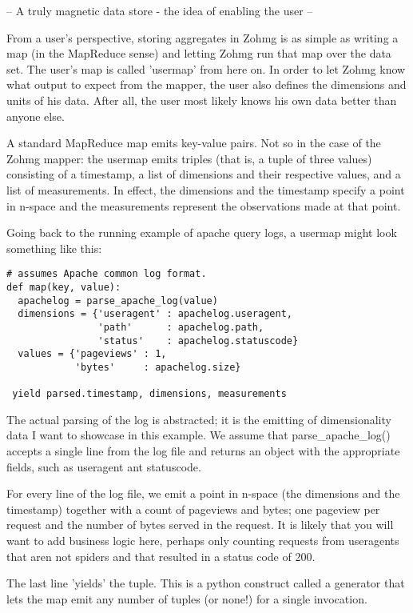 \documentclass[a4paper,10pt]{book}
\begin{document}

-- A truly magnetic data store - the idea of enabling the user --

From a user's perspective, storing aggregates in Zohmg is as simple as writing
a map (in the MapReduce sense) and letting Zohmg run that map over the data
set. The user's map is called 'usermap' from here on. In order to let Zohmg
know what output to expect from the mapper, the user also defines the
dimensions and units of his data. After all, the user most likely knows his
own data better than anyone else.

A standard MapReduce map emits key-value pairs. Not so in the case of the
Zohmg mapper: the usermap emits triples (that is, a tuple of three values)
consisting of a timestamp, a list of dimensions and their respective values,
and a list of measurements. In effect, the dimensions and the timestamp
specify a point in n-space and the measurements represent the observations
made at that point.

Going back to the running example of apache query logs, a usermap might look
something like this:

\begin{verbatim}
# assumes Apache common log format.
def map(key, value):
  apachelog = parse_apache_log(value)
  dimensions = {'useragent' : apachelog.useragent,
                'path'      : apachelog.path,
                'status'    : apachelog.statuscode}
  values = {'pageviews' : 1,
            'bytes'     : apachelog.size}
 
 yield parsed.timestamp, dimensions, measurements
\end{verbatim}

The actual parsing of the log is abstracted; it is the emitting of
dimensionality data I want to showcase in this example. We assume that
parse\_apache\_log() accepts a single line from the log file and returns an
object with the appropriate fields, such as useragent ant statuscode.

For every line of the log file, we emit a point in n-space (the dimensions and
the timestamp) together with a count of pageviews and bytes; one pageview per
request and the number of bytes served in the request. It is likely that you
will want to add business logic here, perhaps only counting requests from
useragents that aren not spiders and that resulted in a status code of 200.

The last line 'yields' the tuple. This is a python construct called a
generator that lets the map emit any number of tuples (or none!) for a single
invocation.
\end{document}
